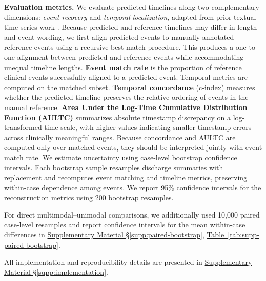 \documentclass{ws-procs11x85}
\newif\ifshowrebuttalcolor
\newcommand{\rebuttal}[1]{%
  \ifshowrebuttalcolor
    \textcolor{rebuttalblue}{#1}%
  \else
    #1%
  \fi
}
\begin{document}
\vspace{5pt}
\noindent\textbf{Evaluation metrics.} We evaluate predicted timelines along two complementary dimensions: \emph{event recovery} and \emph{temporal localization}, adapted from prior textual time-series work \cite{wang2025large,noroozizadeh2026reconstructing}. Because predicted and reference timelines may differ in length and event wording, we first align predicted events to manually annotated reference events using a recursive best-match procedure. This produces a one-to-one alignment between predicted and reference events while accommodating unequal timeline lengths. \textbf{Event match rate} is the proportion of reference clinical events successfully aligned to a predicted event. Temporal metrics are computed on the matched subset. \textbf{Temporal concordance} (c-index) measures whether the predicted timeline preserves the relative ordering of events in the manual reference. \textbf{Area Under the Log-Time Cumulative Distribution Function (AULTC)} summarizes absolute timestamp discrepancy on a log-transformed time scale, with higher values indicating smaller timestamp errors across clinically meaningful ranges. Because concordance and AULTC are computed only over matched events, they should be interpreted jointly with event match rate. 
We estimate uncertainty using case-level bootstrap confidence intervals. Each bootstrap sample resamples discharge summaries with replacement and recomputes event matching and timeline metrics, preserving within-case dependence among events. We report 95\% confidence intervals for the reconstruction metrics using 200 bootstrap resamples.
\rebuttal{For direct multimodal--unimodal comparisons, we additionally used 10,000 paired case-level resamples and report
confidence intervals for the mean within-case differences in \hyperref[supp:paired-bootstrap]{Supplementary Material \S\ref*{supp:paired-bootstrap}}, \hyperref[tab:supp-paired-bootstrap]{Table~\ref*{tab:supp-paired-bootstrap}}.} 
\rebuttal{All implementation and reproducibility details are presented in \hyperref[supp:implementation]{Supplementary Material \S\ref*{supp:implementation}}.}

\end{document}
